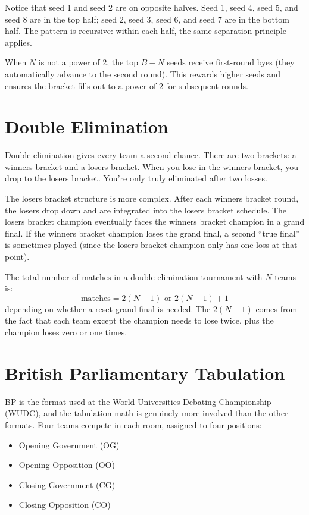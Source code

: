 \documentclass[11pt]{article}
\begin{document}
Notice that seed 1 and seed 2 are on opposite halves. Seed 1, seed 4, seed 5, and seed 8 are in the top half; seed 2, seed 3, seed 6, and seed 7 are in the bottom half. The pattern is recursive: within each half, the same separation principle applies.

When $N$ is not a power of 2, the top $B - N$ seeds receive first-round byes (they automatically advance to the second round). This rewards higher seeds and ensures the bracket fills out to a power of 2 for subsequent rounds.

\section{Double Elimination}

Double elimination gives every team a second chance. There are two brackets: a winners bracket and a losers bracket. When you lose in the winners bracket, you drop to the losers bracket. You're only truly eliminated after two losses.

The losers bracket structure is more complex. After each winners bracket round, the losers drop down and are integrated into the losers bracket schedule. The losers bracket champion eventually faces the winners bracket champion in a grand final. If the winners bracket champion loses the grand final, a second ``true final'' is sometimes played (since the losers bracket champion only has one loss at that point).

The total number of matches in a double elimination tournament with $N$ teams is:
\[
    \text{matches} = 2(N - 1) \text{ or } 2(N - 1) + 1
\]
depending on whether a reset grand final is needed. The $2(N - 1)$ comes from the fact that each team except the champion needs to lose twice, plus the champion loses zero or one times.

\section{British Parliamentary Tabulation}

BP is the format used at the World Universities Debating Championship (WUDC), and the tabulation math is genuinely more involved than the other formats. Four teams compete in each room, assigned to four positions:

\begin{itemize}
    \item Opening Government (OG)
    \item Opening Opposition (OO)
    \item Closing Government (CG)
    \item Closing Opposition (CO)
\end{itemize}
\end{document}
